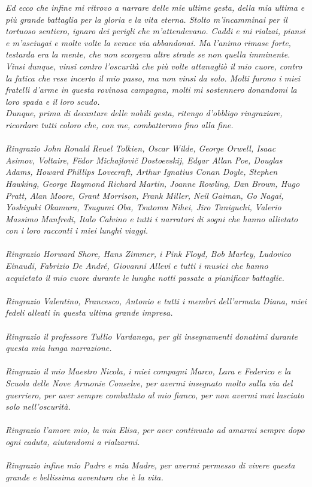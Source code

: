 \textit{Ed ecco che infine mi ritrovo a narrare delle mie ultime gesta, della mia ultima e più grande battaglia per la gloria e la vita eterna. Stolto m'incamminai per il tortuoso sentiero, ignaro dei perigli che m'attendevano. Caddi e mi rialzai, piansi e m'asciugai e molte volte la verace via abbandonai. Ma l'animo rimase forte, testarda era la mente, che non scorgeva altre strade se non quella imminente. Vinsi dunque, vinsi contro l'oscurità che più volte attanagliò il mio cuore, contro la fatica che rese incerto il mio passo, ma non vinsi da solo. Molti furono i miei fratelli d'arme in questa rovinosa campagna, molti mi sostennero donandomi la loro spada e il loro scudo. \\ 
Dunque, prima di decantare delle nobili gesta, ritengo d'obbligo ringraziare, ricordare tutti coloro che, con me, combatterono fino alla fine. \\ \\
Ringrazio John Ronald Reuel Tolkien, Oscar Wilde, George Orwell, Isaac Asimov, Voltaire, Fëdor Michajlovič Dostoevskij, Edgar Allan Poe, Douglas Adams, Howard Phillips Lovecraft, Arthur Ignatius Conan Doyle, Stephen Hawking, George Raymond Richard Martin, Joanne Rowling, Dan Brown, Hugo Pratt, Alan Moore, Grant Morrison, Frank Miller, Neil Gaiman, Go Nagai, Yoshiyuki Okamura, Tsugumi Oba, Tsutomu Nihei, Jiro Taniguchi, Valerio Massimo Manfredi, Italo Calvino e tutti i narratori di sogni che hanno allietato con i loro racconti i miei lunghi viaggi. \\ \\
Ringrazio Horward Shore, Hans Zimmer, i Pink Floyd, Bob Marley, Ludovico Einaudi, Fabrizio De André, Giovanni Allevi e tutti i musici che hanno acquietato il mio cuore durante le lunghe notti passate a pianificar battaglie. \\ \\
Ringrazio Valentino, Francesco, Antonio e tutti i membri dell'armata Diana, miei fedeli alleati in questa ultima grande impresa. \\ \\
Ringrazio il professore Tullio Vardanega, per gli insegnamenti donatimi durante questa mia lunga narrazione. \\ \\
Ringrazio il mio Maestro Nicola, i miei compagni Marco, Lara e Federico e la Scuola delle Nove Armonie Conselve, per avermi insegnato molto sulla via del guerriero, per aver sempre combattuto al mio fianco, per non avermi mai lasciato solo nell'oscurità. \\ \\
Ringrazio l'amore mio, la mia Elisa, per aver continuato ad amarmi sempre dopo ogni caduta, aiutandomi a rialzarmi. \\ \\ 
Ringrazio infine mio Padre e mia Madre, per avermi permesso di vivere questa grande e bellissima avventura che è la vita.}

\endgroup
